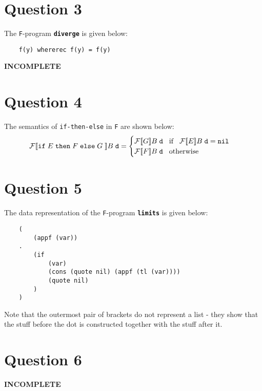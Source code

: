 \documentclass{article}
\begin{document}
\section*{Question 3}
The \texttt{F}-program \textbf{\texttt{diverge}} is given below:
\begin{verbatim}
    f(y) whererec f(y) = f(y)
\end{verbatim}
\textbf{INCOMPLETE}

\section*{Question 4}
The semantics of \texttt{if-then-else} in \texttt{F} are shown below:
\begin{equation*}
    \mathcal{F} [\![ \texttt{if} \hspace{1mm} E \hspace{1mm} \texttt{then} \hspace{1mm} F \hspace{1mm} \texttt{else} \hspace{1mm} G \hspace{1mm} ]\!] B \hspace{1mm} \texttt{d} = \begin{cases}
        \mathcal{F} [\![ G ]\!] B \hspace{1mm} \texttt{d} \hspace{3mm} \text{if} \hspace{3mm} \mathcal{F} [\![ E ]\!] B \hspace{1mm} \texttt{d} = \texttt{nil} \\
        \mathcal{F} [\![ F ]\!] B \hspace{1mm} \texttt{d} \hspace{3mm} \text{otherwise}
    \end{cases}
\end{equation*}

\section*{Question 5}
The data representation of the \texttt{F}-program \textbf{\texttt{limits}} is given below:
\begin{verbatim}
    (
        (appf (var))
    .
        (if
            (var)
            (cons (quote nil) (appf (tl (var))))
            (quote nil)
        )
    )
\end{verbatim}
Note that the outermost pair of brackets do not represent a list - they show that the stuff before the dot is constructed together with the stuff after it.

\section*{Question 6}
\textbf{INCOMPLETE}
\end{document}
